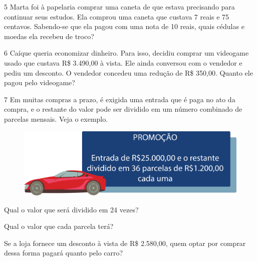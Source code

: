 \num{5} Marta foi à papelaria comprar uma caneta de que estava precisando para
continuar seus estudos. Ela comprou uma caneta que custava 7 reais e 75
centavos. Sabendo-se que ela pagou com uma nota de 10 reais, quais
cédulas e moedas ela recebeu de troco?


\num{6} Caíque queria economizar  dinheiro. Para isso, decidiu comprar um videogame usado
que custava R\$ 3.490,00 à vista. Ele ainda conversou com o vendedor e pediu
um desconto. O vendedor concedeu  uma redução de R\$ 350,00. Quanto ele pagou pelo videogame?


\pagebreak
\num{7} Em muitas compras a prazo, é exigida uma entrada que é paga no ato da
compra, e o restante do valor pode ser dividido em um número combinado de
parcelas mensais. Veja o exemplo.

\begin{figure}[htpb!]
\centering
\includegraphics[width=\textwidth]{./media/image68.png}
\end{figure}

\begin{escolha}
\item Qual o valor que será dividido em 24 vezes?\\

\item Qual o valor que cada parcela terá?\\

\item Se a loja fornece um desconto à vista de R\$ 2.580,00, quem optar por
  comprar dessa forma pagará quanto pelo carro?\\
\end{escolha}

